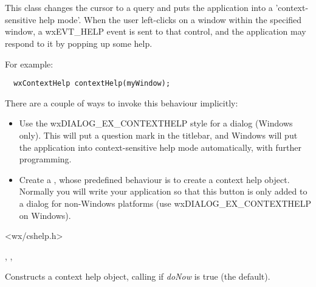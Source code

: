 \section{}\label{wxcontexthelp}

This class changes the cursor to a query and puts the application into a 'context-sensitive help mode'.
When the user left-clicks on a window within the specified window, a wxEVT\_HELP event is
sent to that control, and the application may respond to it by popping up some help.

For example:

\begin{verbatim}
  wxContextHelp contextHelp(myWindow);
\end{verbatim}

There are a couple of ways to invoke this behaviour implicitly:

\begin{itemize}
\item Use the wxDIALOG\_EX\_CONTEXTHELP style for a dialog (Windows only). This will put a question mark
in the titlebar, and Windows will put the application into context-sensitive help mode automatically,
with further programming.
\item Create a , whose predefined behaviour is to create a context help object.
Normally you will write your application so that this button is only added to a dialog for non-Windows platforms
(use wxDIALOG\_EX\_CONTEXTHELP on Windows).
\end{itemize}




<wx/cshelp.h>


, 
, 




Constructs a context help object, calling  if\rtfsp
{\it doNow} is true (the default).

